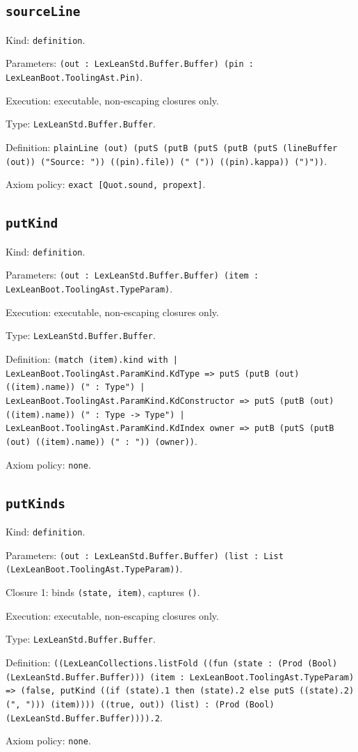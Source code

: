 \documentclass[11pt]{article}
\begin{document}
\subsection*{\texttt{sourceLine}}
\noindent Kind: \texttt{definition}.\par
\noindent Parameters: \texttt{(out : LexLeanStd.Buffer.Buffer) (pin : LexLeanBoot.ToolingAst.Pin)}.\par
\noindent Execution: executable, non-escaping closures only.\par
\noindent Type: \texttt{LexLeanStd.Buffer.Buffer}.\par
\noindent Definition: \texttt{plainLine (out) (putS (putB (putS (putB (putS (lineBuffer (out)) ("Source: ")) ((pin).file)) (" (")) ((pin).kappa)) (")"))}.\par
\noindent Axiom policy: \texttt{exact [Quot.sound, propext]}.\par
\subsection*{\texttt{putKind}}
\noindent Kind: \texttt{definition}.\par
\noindent Parameters: \texttt{(out : LexLeanStd.Buffer.Buffer) (item : LexLeanBoot.ToolingAst.TypeParam)}.\par
\noindent Execution: executable, non-escaping closures only.\par
\noindent Type: \texttt{LexLeanStd.Buffer.Buffer}.\par
\noindent Definition: \texttt{(match (item).kind with | LexLeanBoot.ToolingAst.ParamKind.KdType => putS (putB (out) ((item).name)) (" : Type") | LexLeanBoot.ToolingAst.ParamKind.KdConstructor => putS (putB (out) ((item).name)) (" : Type -> Type") | LexLeanBoot.ToolingAst.ParamKind.KdIndex owner => putB (putS (putB (out) ((item).name)) (" : ")) (owner))}.\par
\noindent Axiom policy: \texttt{none}.\par
\subsection*{\texttt{putKinds}}
\noindent Kind: \texttt{definition}.\par
\noindent Parameters: \texttt{(out : LexLeanStd.Buffer.Buffer) (list : List (LexLeanBoot.ToolingAst.TypeParam))}.\par
\noindent Closure 1: binds \texttt{(state, item)}, captures \texttt{()}.\par
\noindent Execution: executable, non-escaping closures only.\par
\noindent Type: \texttt{LexLeanStd.Buffer.Buffer}.\par
\noindent Definition: \texttt{((LexLeanCollections.listFold ((fun (state : (Prod (Bool) (LexLeanStd.Buffer.Buffer))) (item : LexLeanBoot.ToolingAst.TypeParam) => (false, putKind ((if (state).1 then (state).2 else putS ((state).2) (", "))) (item)))) ((true, out)) (list) : (Prod (Bool) (LexLeanStd.Buffer.Buffer)))).2}.\par
\noindent Axiom policy: \texttt{none}.\par
\end{document}
